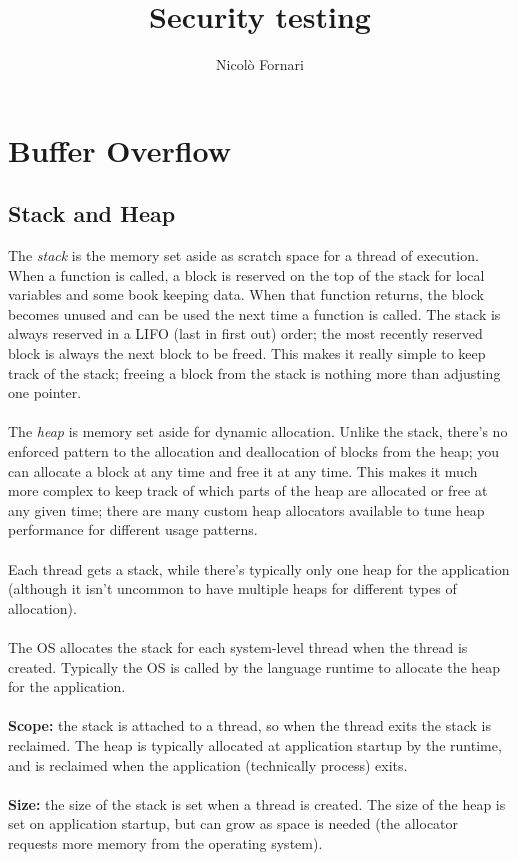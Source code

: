 \documentclass[10pt,a4paper]{book}
\author{Nicolò Fornari}
\title{Security testing}
\begin{document}
\chapter{Buffer Overflow}
\section{Stack and Heap}
The \emph{stack} is the memory set aside as scratch space for a thread of execution. When a function is called, a block is reserved on the top of the stack for local variables and some book keeping data. When that function returns, the block becomes unused and can be used the next time a function is called. The stack is always reserved in a LIFO (last in first out) order; the most recently reserved block is always the next block to be freed. This makes it really simple to keep track of the stack; freeing a block from the stack is nothing more than adjusting one pointer.\\\\
The \emph{heap} is memory set aside for dynamic allocation. Unlike the stack, there's no enforced pattern to the allocation and deallocation of blocks from the heap; you can allocate a block at any time and free it at any time. This makes it much more complex to keep track of which parts of the heap are allocated or free at any given time; there are many custom heap allocators available to tune heap performance for different usage patterns.\\\\
Each thread gets a stack, while there's typically only one heap for the application (although it isn't uncommon to have multiple heaps for different types of allocation).\\\\
The OS allocates the stack for each system-level thread when the thread is created. Typically the OS is called by the language runtime to allocate the heap for the application.\\\\
\textbf{Scope:} the stack is attached to a thread, so when the thread exits the stack is reclaimed. The heap is typically allocated at application startup by the runtime, and is reclaimed when the application (technically process) exits.\\\\
\textbf{Size:} the size of the stack is set when a thread is created. The size of the heap is set on application startup, but can grow as space is needed (the allocator requests more memory from the operating system).\\\\
\end{document}
